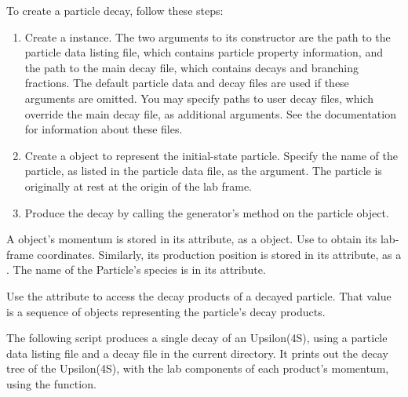 To create a particle decay, follow these steps:
\begin{enumerate}

 \item Create a  instance.  The two arguments to its
 constructor are the path to the particle data listing file, which
 contains particle property information, and the path to the main decay
 file, which contains decays and branching fractions.  The default
 \evtgen particle data and decay files are used if these arguments are
 omitted.  You may specify paths to user decay files, which override the
 main decay file, as additional arguments.  See the \evtgen
 documentation for information about these files.

 \item Create a  object to represent the initial-state
 particle.  Specify the name of the particle, as listed in the particle
 data file, as the argument.  The particle is originally at rest at the
 origin of the lab frame.

 \item Produce the decay by calling the generator's 
 method on the particle object.

\end{enumerate}

A  object's momentum is stored in its 
attribute, as a  object.  Use
 to obtain its lab-frame
coordinates.  Similarly, its production position is stored in its
 attribute, as a .
The name of the Particle's species is in its  attribute.

Use the  attribute to access the decay products
of a decayed particle.  That value is a sequence of 
objects representing the particle's decay products.

The following script produces a single decay of an Upsilon(4S), using
a particle data listing file and a decay file in the current directory.
It prints out the decay tree of the Upsilon(4S), with the lab components
of each product's momentum, using the 
function.

